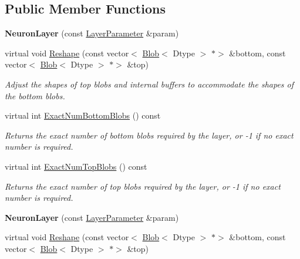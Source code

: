 \subsection*{Public Member Functions}
\begin{DoxyCompactItemize}
\item 
\mbox{\label{classcaffe_1_1_neuron_layer_a43348846697146ea9f01a773855b0915}} 
{\bfseries Neuron\+Layer} (const \mbox{\hyperlink{classcaffe_1_1_layer_parameter}{Layer\+Parameter}} \&param)
\item 
virtual void \mbox{\hyperlink{classcaffe_1_1_neuron_layer_a6d0facf4a5e6f459cf1cb8b28d945790}{Reshape}} (const vector$<$ \mbox{\hyperlink{classcaffe_1_1_blob}{Blob}}$<$ Dtype $>$ $\ast$$>$ \&bottom, const vector$<$ \mbox{\hyperlink{classcaffe_1_1_blob}{Blob}}$<$ Dtype $>$ $\ast$$>$ \&top)
\begin{DoxyCompactList}\small\item\em Adjust the shapes of top blobs and internal buffers to accommodate the shapes of the bottom blobs. \end{DoxyCompactList}\item 
virtual int \mbox{\hyperlink{classcaffe_1_1_neuron_layer_abb6c0e6acd2863baf47d6e6acda6f55f}{Exact\+Num\+Bottom\+Blobs}} () const
\begin{DoxyCompactList}\small\item\em Returns the exact number of bottom blobs required by the layer, or -\/1 if no exact number is required. \end{DoxyCompactList}\item 
virtual int \mbox{\hyperlink{classcaffe_1_1_neuron_layer_a47ac5e7208e4b14ad1e4040a621dbfbc}{Exact\+Num\+Top\+Blobs}} () const
\begin{DoxyCompactList}\small\item\em Returns the exact number of top blobs required by the layer, or -\/1 if no exact number is required. \end{DoxyCompactList}\item 
\mbox{\label{classcaffe_1_1_neuron_layer_a43348846697146ea9f01a773855b0915}} 
{\bfseries Neuron\+Layer} (const \mbox{\hyperlink{classcaffe_1_1_layer_parameter}{Layer\+Parameter}} \&param)
\item 
virtual void \mbox{\hyperlink{classcaffe_1_1_neuron_layer_a2c87bff832b685db76a41cbc8539e7ce}{Reshape}} (const vector$<$ \mbox{\hyperlink{classcaffe_1_1_blob}{Blob}}$<$ Dtype $>$ $\ast$$>$ \&bottom, const vector$<$ \mbox{\hyperlink{classcaffe_1_1_blob}{Blob}}$<$ Dtype $>$ $\ast$$>$ \&top)

\end{DoxyCompactItemize}
